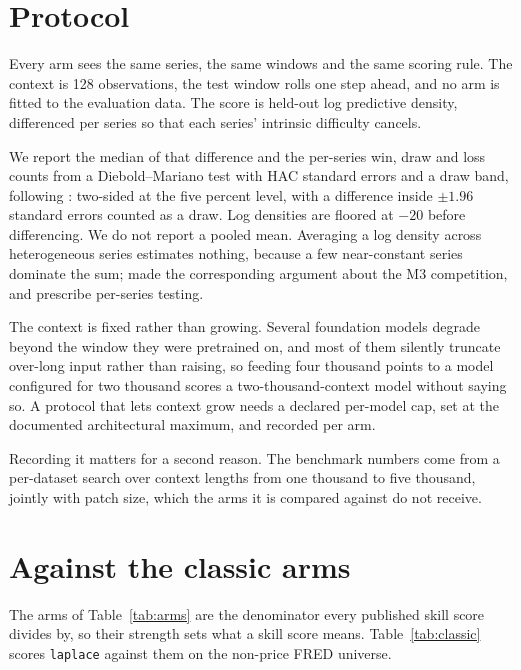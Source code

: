 \documentclass[article]{jss}
\providecommand{\proglang}[1]{\textsf{#1}}
\providecommand{\code}[1]{\texttt{#1}}
\begin{document}
\section{Protocol}\label{sec:protocol}

Every arm sees the same series, the same windows and the same scoring rule. The
context is 128 observations, the test window rolls one step ahead, and no arm is
fitted to the evaluation data. The score is held-out log predictive density,
differenced per series so that each series' intrinsic difficulty cancels.

We report the median of that difference and the per-series win, draw and loss
counts from a Diebold--Mariano test with HAC standard errors and a draw band,
following \citet{diebold1995comparing}: two-sided at the five percent level,
with a difference inside $\pm 1.96$ standard errors counted as a draw. Log
densities are floored at $-20$ before differencing. We do not report a pooled
mean.
Averaging a log density across heterogeneous series estimates nothing, because a
few near-constant series dominate the sum; \citet{koning2005m3} made the
corresponding argument about the M3 competition, and \citet{hewamalage2023evaluation}
prescribe per-series testing.

The context is fixed rather than growing. Several foundation models degrade
beyond the window they were pretrained on, and most of them silently truncate
over-long input rather than raising, so feeding four thousand points to a model
configured for two thousand scores a two-thousand-context model without saying
so. A protocol that lets context grow needs a declared per-model cap, set at the
documented architectural maximum, and recorded per arm.

Recording it matters for a second reason. The \citet{woo2024moirai} benchmark
numbers come from a per-dataset search over context lengths from one thousand to
five thousand, jointly with patch size, which the arms it is compared against do
not receive.

\section{Against the classic arms}\label{sec:classic}

The arms of Table~\ref{tab:arms} are the denominator every published skill
score divides by, so their strength sets what a skill score means.
Table~\ref{tab:classic} scores \code{laplace} against them on the non-price
\proglang{FRED} universe.
\end{document}
